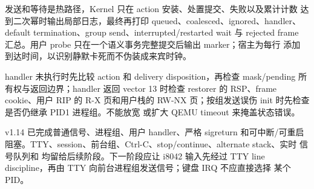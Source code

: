 发送和等待是热路径，Kernel 只在 action 安装、处置提交、失败以及累计计数
达到二次幂时输出局部日志，最终再打印 queued、coalesced、ignored、handler、
default termination、group send、interrupted/restarted wait 与 rejected
frame 汇总。用户 probe 只在一个语义事务完整提交后输出 marker；宿主为每行
添加 \code{[QEMU][T+...ms]} 到达时间，以识别静默卡死而不伪装成来宾时钟。

handler 未执行时先比较 action 和 delivery disposition，再检查 mask/pending
所有权与返回边界；handler 返回 vector 13 时检查 restorer 的 RSP、frame
cookie、用户 RIP 的 R-X 页和用户栈的 RW-NX 页；按组发送误伤 init 时先检查
是否仍继承 PID1 进程组。不能放宽  或扩大 QEMU
timeout 来掩盖状态错误。

v1.14 已完成普通信号、进程组、用户 handler、严格 sigreturn 和可中断/可重启
阻塞。TTY、session、前台组、Ctrl-C、stop/continue、alternate stack、实时
信号队列和  均留给后续阶段。下一阶段应让 i8042 输入先经过
TTY line discipline，再由 TTY 向前台进程组发送信号；键盘 IRQ 不应直接选择
某个 PID。

